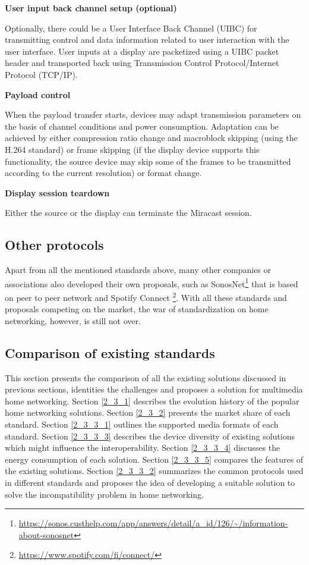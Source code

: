 \textbf{User input back channel setup (optional)}

Optionally, there could be a User Interface Back Channel (UIBC) for transmitting
control and data information related to user interaction with the user interface. User inputs at a display are packetized using a UIBC packet header and transported back using Transmission Control Protocol/Internet Protocol (TCP/IP).

\textbf{Payload control}

When the payload transfer starts, devices may adapt transmission parameters on
the basis of channel conditions and power consumption. Adaptation can be achieved by either compression ratio change and macroblock skipping (using the H.264 standard) or frame skipping (if the display device supports this functionality, the source device may skip some of the frames to be transmitted according to the current resolution) or format change.

\textbf{Display session teardown}

Either the source or the display can terminate the Miracast session.
\subsection{Other protocols\label{2_2_6}}
Apart from all the mentioned standards above, many other companies or associations 
also developed their own proposals, such as
SonosNet\footnote{\url{https://sonos.custhelp.com/app/answers/detail/a_id/126/~/information-about-sonosnet}} that is based on peer to peer network and Spotify Connect 
\footnote{\url{https://www.spotify.com/fi/connect/}}. With all these standards
and proposals competing on the market, the war of standardization on home
networking, however, is still not over.

\subsection{Comparison of existing standards\label{2_3}} 
This section presents the comparison of all the existing solutions discussed in
previous sections, identities the challenges and proposes a solution for
multimedia home networking. Section \ref{2_3_1} describes the evolution history
of the popular home networking solutions. Section \ref{2_3_2} presents the
market share of each standard. Section \ref{2_3_3_1} outlines the supported
media formats of each standard. Section \ref{2_3_3_3} describes the device
diversity of existing solutions which might influence the interoperability.
Section \ref{2_3_3_4} discusses the energy consumption of each solution. Section
\ref{2_3_3_5} compares the features of the existing solutions. Section
\ref{2_3_3_2} summarizes the common protocols used in different standards and
proposes the idea of developing a suitable solution to solve the
incompatibility problem in home networking.
